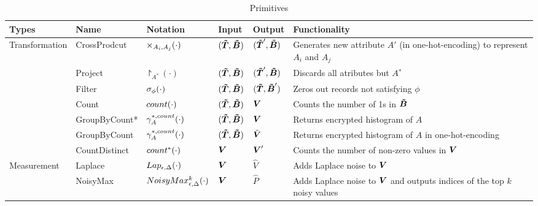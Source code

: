 

\begin{table*}[]
\small{
\caption {\system Primitives}\label{tab:primitives}
\begin{tabular}{|l|l|l|l|l|l|}
\hline
\bf{Types}                           & \bf{Name}         & \bf{Notation} & \bf{Input} & \bf{Output} & \bf{Functionality} \\ \hline \hline
\multirow{7}{*}{Transformation} & CrossProdcut &  $\times_{A_i,A_j}(\cdot)$ &  $(\boldsymbol{\tilde{T}},\boldsymbol{\tilde{B}})$   &  $(\boldsymbol{\tilde{T}}',\boldsymbol{\tilde{B}})$   & Generates new attribute $A'$ (in one-hot-encoding) to represent $A_i$ and $A_j$  \\ \cline{2-6}
                                & Project      & $\project_{A^*}(\cdot)$  &  $(\boldsymbol{\tilde{T}},\boldsymbol{\tilde{B}})$       &  $(\boldsymbol{\tilde{T}}',\boldsymbol{\tilde{B}})$       &  Discards all atributes but $A^∗$ \\ \cline{2-6}
                                & Filter       & $\sigma_{\phi}(\cdot)$   &  $(\boldsymbol{\tilde{T}},\boldsymbol{\tilde{B}})$      &   $(\boldsymbol{\tilde{T}},\boldsymbol{\tilde{B}}')$     &  Zeros out records not satisfying $\phi$              \\ \cline{2-6}
                                & Count              & $count(\cdot)$         & $(\boldsymbol{\tilde{T}},\boldsymbol{\tilde{B}})$  &  $\boldsymbol{V}$    &  Counts the number of 1s in $\boldsymbol{\tilde{B}}$               \\ \cline{2-6}
                                & GroupByCount*              & $\gamma^{*,count}_{A}(\cdot)$ &  $(\boldsymbol{\tilde{T}},\boldsymbol{\tilde{B}})$  & $\boldsymbol{V}$    & Returns encrypted histogram of $A$                \\ \cline{2-6}
                                & GroupByCount              & $\gamma^{*,count}_{A}(\cdot)$    &$(\boldsymbol{\tilde{T}},\boldsymbol{\tilde{B}})$       & $\tilde{\boldsymbol{V}}$        &  Returns encrypted histogram of $A$ in one-hot-encoding    \\ \cline{2-6}
                                & CountDistinct             & $count^*(\cdot)$     &    $\boldsymbol{V}$   & $\boldsymbol{V}'$   &  Counts the number of non-zero values in $\boldsymbol{V}$       \\ \hline
\multirow{2}{*}{Measurement}    & Laplace      & $Lap_{\epsilon,\Delta}(\cdot)$    &  $\boldsymbol{V}$      &   $\hat{V}$    &  Adds Laplace noise to $\boldsymbol{V}$    \\ \cline{2-6}
                                & NoisyMax     & $NoisyMax_{\epsilon,\Delta}^k(\cdot)$         & $\boldsymbol{V}$       &  $\hat{P}$      &  Adds Laplace noise to $\boldsymbol{V}$ and outputs indices of the top $k$ noisy values              \\ \hline
\end{tabular}
}
\end{table*}


